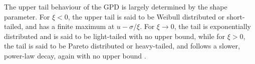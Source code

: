 \documentclass{article}
\numberwithin{equation}{section}
\begin{document}

The upper tail behaviour of the GPD is largely determined by the shape parameter. %
For $\xi <0$, the upper tail is said to be Weibull distributed or short-tailed, and has a finite maximum at $u - \sigma/\xi$.
For $\xi \to 0$, the tail is exponentially distributed and is said to be light-tailed with no upper bound, while for $\xi > 0$, the tail is said to be Pareto distributed or heavy-tailed, and follows a slower, power-law decay, again with no upper bound \citep{Rohrbeck2021, Carreau2017}.


\end{document}
